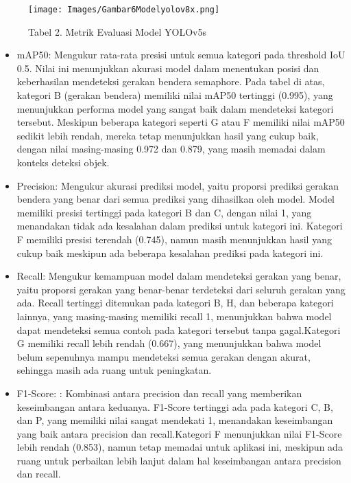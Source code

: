 \documentclass[12pt,a4paper]{article}
\begin{document}
\begin{figure}[h]
        \centering
        \texttt{[image: Images/Gambar6Modelyolov8x.png]}
        \caption*{Tabel 2. Metrik Evaluasi Model YOLOv5s}
        \label{fig:enter-label}
    \end{figure}
\begin{adjustwidth}{3em}{0pt} 

\begin{itemize}
    \item mAP50: Mengukur rata-rata presisi untuk semua kategori pada threshold IoU 0.5. Nilai ini menunjukkan akurasi model dalam menentukan posisi dan keberhasilan mendeteksi gerakan bendera semaphore. Pada tabel di atas, kategori B (gerakan bendera) memiliki nilai mAP50 tertinggi (0.995), yang menunjukkan performa model yang sangat baik dalam mendeteksi kategori tersebut. Meskipun beberapa kategori seperti G atau F memiliki nilai mAP50 sedikit lebih rendah, mereka tetap menunjukkan hasil yang cukup baik, dengan nilai masing-masing 0.972 dan 0.879, yang masih memadai dalam konteks deteksi objek.

    
    \item Precision: Mengukur akurasi prediksi model, yaitu proporsi prediksi gerakan bendera yang benar dari semua prediksi yang dihasilkan oleh model. Model memiliki presisi tertinggi pada kategori B dan C, dengan nilai 1, yang menandakan tidak ada kesalahan dalam prediksi untuk kategori ini. Kategori F memiliki presisi terendah (0.745), namun masih menunjukkan hasil yang cukup baik meskipun ada beberapa kesalahan prediksi pada kategori ini.

    
    \item Recall: Mengukur kemampuan model dalam mendeteksi gerakan yang benar, yaitu proporsi gerakan yang benar-benar terdeteksi dari seluruh gerakan yang ada. Recall tertinggi ditemukan pada kategori B, H, dan beberapa kategori lainnya, yang masing-masing memiliki recall 1, menunjukkan bahwa model dapat mendeteksi semua contoh pada kategori tersebut tanpa gagal.Kategori G memiliki recall lebih rendah (0.667), yang menunjukkan bahwa model belum sepenuhnya mampu mendeteksi semua gerakan dengan akurat, sehingga masih ada ruang untuk peningkatan.
    
    \item F1-Score: : Kombinasi antara precision dan recall yang memberikan keseimbangan antara keduanya. F1-Score tertinggi ada pada kategori C, B, dan P, yang memiliki nilai sangat mendekati 1, menandakan keseimbangan yang baik antara precision dan recall.Kategori F menunjukkan nilai F1-Score lebih rendah (0.853), namun tetap memadai untuk aplikasi ini, meskipun ada ruang untuk perbaikan lebih lanjut dalam hal keseimbangan antara precision dan recall.


\end{itemize}
\end{adjustwidth}
\end{document}
